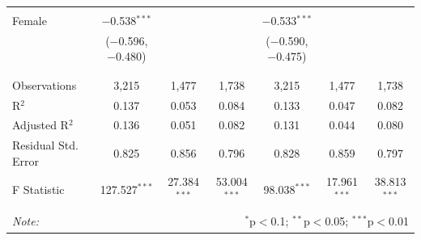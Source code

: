 \documentclass[12pt,a4paper]{article}
\numberwithin{equation}{section}
\begin{document}
\begin{landscape}
\begin{table}[!htbp]
\begin{tabular}{@{\extracolsep{5pt}}lcccccc}
			& & & & & & \\ 
			Female & $-$0.538$^{***}$ &  &  & $-$0.533$^{***}$ &  &  \\ 
			& ($-$0.596, $-$0.480) &  &  & ($-$0.590, $-$0.475) &  &  \\ 
			& & & & & & \\ 
			\hline \\[-1.8ex] 
			Observations & 3,215 & 1,477 & 1,738 & 3,215 & 1,477 & 1,738 \\ 
			R$^{2}$ & 0.137 & 0.053 & 0.084 & 0.133 & 0.047 & 0.082 \\ 
			Adjusted R$^{2}$ & 0.136 & 0.051 & 0.082 & 0.131 & 0.044 & 0.080 \\ 
			Residual Std. Error & 0.825 & 0.856 & 0.796 & 0.828 & 0.859 & 0.797 \\ 
			F Statistic & 127.527$^{***}$ & 27.384$^{***}$ & 53.004$^{***}$ & 98.038$^{***}$ & 17.961$^{***}$ & 38.813$^{***}$ \\ 
			\hline 
			\hline \\[-1.8ex] 
			\textit{Note:}  & \multicolumn{6}{r}{$^{*}$p$<$0.1; $^{**}$p$<$0.05; $^{***}$p$<$0.01} \\ 
		\end{tabular} 
	\end{table} 
	
\end{landscape}

\newpage
\end{document}

